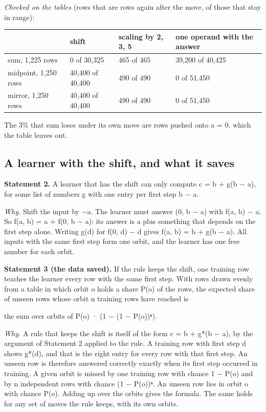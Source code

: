 \emph{Checked on the tables} (rows that are rows again after the move, of those that stay in range):

\begin{center}\small
\begin{tabularx}{\linewidth}{@{}YllY@{}}
\toprule
 & shift & scaling by 2, 3, 5 & one operand with the answer \\
\midrule
sum, 1,225 rows & 0 of 30,325 & 465 of 465 & 39,200 of 40,425 \\
midpoint, 1,250 rows & 40,400 of 40,400 & 490 of 490 & 0 of 51,450 \\
mirror, 1,250 rows & 40,400 of 40,400 & 490 of 490 & 0 of 51,450 \\
\bottomrule
\end{tabularx}
\end{center}

The 3\% that sum loses under its own move are rows pushed onto a = 0, which the table leaves out.

\subsection{A learner with the shift, and what it saves}\label{sec:3.6.2}

\textbf{Statement 2.} A learner that has the shift can only compute c = b + g(b − a), for some list of numbers g with one entry per first step b − a.

\emph{Why.} Shift the input by −a. The learner must answer (0, b − a) with f(a, b) − a. So f(a, b) = a + f(0, b − a): its answer is a plus something that depends on the first step alone. Writing g(d) for f(0, d) − d gives f(a, b) = b + g(b − a). All inputs with the same first step form one orbit, and the learner has one free number for each orbit.

\textbf{Statement 3 (the data saved).} If the rule keeps the shift, one training row teaches the learner every row with the same first step. With rows drawn evenly from a table in which orbit o holds a share P(o) of the rows, the expected share of unseen rows whose orbit n training rows have reached is

the sum over orbits of P(o) · (1 − (1 − P(o))ⁿ).

\emph{Why.} A rule that keeps the shift is itself of the form c = b + g*(b − a), by the argument of Statement 2 applied to the rule. A training row with first step d shows g*(d), and that is the right entry for every row with that first step. An unseen row is therefore answered correctly exactly when its first step occurred in training. A given orbit is missed by one training row with chance 1 − P(o) and by n independent rows with chance (1 − P(o))ⁿ. An unseen row lies in orbit o with chance P(o). Adding up over the orbits gives the formula. The same holds for any set of moves the rule keeps, with its own orbits.

